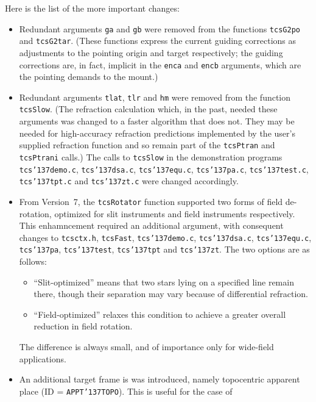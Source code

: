 \documentclass[12pt,fleqn,twoside]{article}
\renewcommand{\_}{{\tt\char'137}}     %
\begin{document}
Here is the list of the more important changes:
\begin{itemize}
\item Redundant arguments {\tt ga} and {\tt gb} were removed from
      the functions {\tt tcsG2po} and {\tt tcsG2tar}.  (These
      functions express the
      current guiding corrections as adjustments to the pointing origin
      and target respectively;  the guiding corrections are, in fact,
      implicit in the {\tt enca} and {\tt encb} arguments, which
      are the pointing demands to the mount.)
\item Redundant arguments {\tt tlat}, {\tt tlr} and {\tt hm} were
      removed from the function {\tt tcsSlow}.  (The
      refraction calculation which, in the past, needed these
      arguments was changed to a faster algorithm that does not.
      They may be
      needed for high-accuracy refraction predictions implemented
      by the user's supplied refraction function and so remain
      part of the {\tt tcsPtran} and {\tt tcsPtrani} calls.)  The
      calls to {\tt tcsSlow} in the demonstration programs
      {\tt tcs\_demo.c},
      {\tt tcs\_dsa.c},
      {\tt tcs\_equ.c},
      {\tt tcs\_pa.c},
      {\tt tcs\_test.c},
      {\tt tcs\_tpt.c} and
      {\tt tcs\_zt.c}
      were changed accordingly.
\item From Version~7, the {\tt tcsRotator} function
      supported two forms of
      field de-rotation, optimized for slit instruments and field
      instruments respectively.  This enhamncement required an additional
      argument, with consequent changes to
      {\tt tcsctx.h},
      {\tt tcsFast},
      {\tt tcs\_demo.c},
      {\tt tcs\_dsa.c},
      {\tt tcs\_equ.c},
      {\tt tcs\_pa},
      {\tt tcs\_test},
      {\tt tcs\_tpt} and
      {\tt tcs\_zt}.  The two options are as follows:
      \begin{itemize}
      \item ``Slit-optimized''
      means that two stars lying on a specified line
      remain there, though their separation may vary because of
      differential refraction.
      \item ``Field-optimized''
      relaxes this condition to achieve a greater overall reduction in
      field rotation.
      \end{itemize}
      The difference is always small, and of importance
      only for wide-field applications.
\item An additional target frame is was introduced, namely
      topocentric apparent
      place (ID = {\tt APPT\_TOPO}).  This is useful for the case of

\end{itemize}
\end{document}
